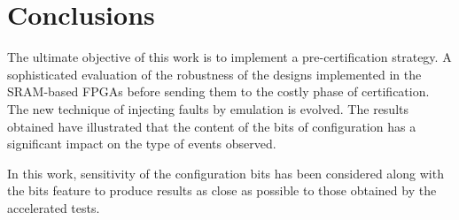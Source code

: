\section{Conclusions}


The ultimate objective of this work is to implement a pre-certification strategy.
A sophisticated evaluation of the robustness of the designs implemented in the
SRAM-based FPGAs before sending them to the costly phase of
certification. The new technique of injecting faults by emulation is evolved.  The results obtained have illustrated that the content of the bits of
configuration has a significant impact on the type of events observed. 


In this work, sensitivity of the configuration bits has been considered along with the bits feature to
produce results as close as possible to those obtained by the accelerated tests. 



\label{Conclusion}

